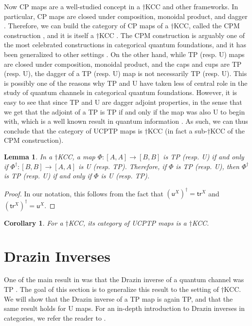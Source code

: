 \documentclass[submission,copyright,creativecommons]{eptcs}
\newtheorem{lemma}[observation]{Lemma}  %
\newtheorem{corollary}[observation]{Corollary}
\begin{document}
Now CP maps are a well-studied concept in a $\dagger$KCC and other frameworks. In particular, CP maps are closed under composition, monoidal product, and dagger \cite[Lem 4.17]{selinger2007dagger}. Therefore, we can build the category of CP maps of a $\dagger$KCC, called the CPM construction \cite[Def 4.18]{selinger2007dagger}, and it is itself a $\dagger$KCC \cite[Thm 4.20]{selinger2007dagger}. The CPM construction is arguably one of the most celebrated constructions in categorical quantum foundations, and it has been generalized to other settings \cite{coecke2016categories,coecke2016_cpinf,Coecke_2012,Cunningham_2015,Gogioso_2019}. On the other hand, while TP (resp. U) maps are closed under composition, monoidal product, and the caps and cups are TP (resp. U), the dagger of a TP (resp. U) map is not necessarily TP (resp. U). This is possibly one of the reasons why TP and U have taken less of central role in the study of quantum channels in categorical quantum foundations. However, it is easy to see that since TP and U are dagger adjoint properties, in the sense that we get that the adjoint of a TP is TP if and only if the map was also U to begin with, which is a well known result in quantum information \cite[Thm 2.26]{watrous2018theory}. As such, we can thus conclude that the category of UCPTP maps is $\dagger$KCC (in fact a sub-$\dagger$KCC of the CPM construction). 

\begin{lemma} In a $\dagger$KCC, a map $\Phi: [A,A] \to [B,B]$ is TP (resp. U) if and only if $\Phi^\dagger: [B,B] \to [A,A]$ is U (resp. TP). Therefore, if $\Phi$ is TP (resp. U), then $\Phi^\dagger$ is TP (resp. U) if and only if $\Phi$ is U (resp. TP). 
\end{lemma}
\begin{proof} In our notation, this follows from the fact that $\left({\mathsf{u}^X}\right)^\dagger = \mathsf{tr}^X$ and $\left({\mathsf{tr}^X}\right)^\dagger = \mathsf{u}^X$. 
\end{proof}

\begin{corollary} For a $\dagger$KCC, its category of UCPTP maps is a $\dagger$KCC. 
\end{corollary}

\section{Drazin Inverses}

One of the main result in \cite{cao2021nisq} was that the Drazin inverse of a quantum channel was TP \cite[Thm 2]{cao2021nisq}. The goal of this section is to generalize this result to the setting of $\dagger$KCC. We will show that the Drazin inverse of a TP map is again TP, and that the same result holds for U maps. For an in-depth introduction to Drazin inverses in categories, we refer the reader to \cite{cockett2024drazin}. 
\end{document}
